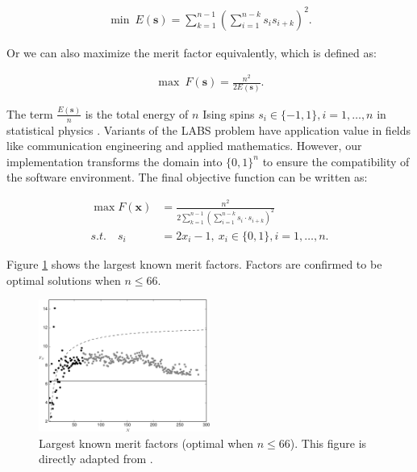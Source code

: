 \documentclass{article}
\begin{document}
\begin{align*}
    \min\ E\left( \mathbf{s} \right) = \sum_{k = 1}^{n - 1}\left( \sum_{i = 1}^{n - k} s_is_{i + k} \right)^2. 
\end{align*}

Or we can also maximize the merit factor equivalently, which is defined as:

\begin{align*}
    \max\ F\left( \mathbf{s} \right) = \frac{n^2}{2E\left( \mathbf{s} \right) }.
\end{align*}

The term $\frac{E(\mathbf{s})}{n}$ is the total energy of $n$ Ising spins $s_i\in\{-1, 1\}, i = 1, \dots, n$ in statistical physics \cite{2016packebusch}. Variants of the LABS problem have application value in fields like communication engineering and applied mathematics. However, our implementation transforms the domain into $\{0, 1\}^n$ to ensure the compatibility of the software environment. The final objective function can be written as:

\begin{align*}
    \max F(\mathbf{x}) &= \frac{n^2}{2 \sum_{k = 1}^{n - 1}\left(\sum_{i = 1}^{n - k} s_i\cdot s_{i + k}  \right)^2 }\\
    s.t.\quad s_i &= 2x_i - 1,\ x_i\in\{0, 1\}, i = 1, \dots, n.
\end{align*}

Figure \ref{fig:intro-labs} shows the largest known merit factors. Factors are confirmed to be optimal solutions when $n \leq 66$.

\begin{figure}[!ht]
 \begin{center}    
     \includegraphics[width=0.5\textwidth]{labs.png}
 \end{center}
 \caption{Largest known merit factors (optimal when $n \leq 66$). This figure is directly adapted from \cite{2016packebusch}.}
 \label{fig:intro-labs}
\end{figure}
\end{document}
